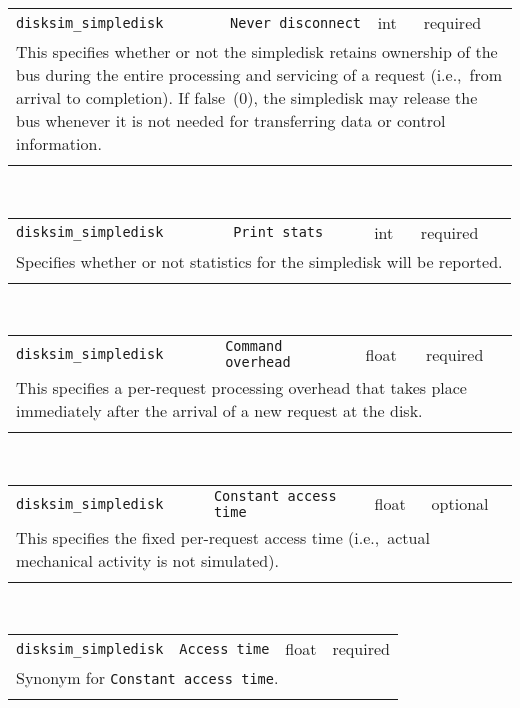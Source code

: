 \noindent 
\begin{tabular}{|p{\lpmodwidth}|p{\lpnamewidth}|p{0.5in}|p{0.5in}|}
\cline{1-4}
\texttt{disksim\_simpledisk} & \texttt{Never disconnect} & int & required \\ 
\cline{1-4}
\multicolumn{4}{|p{6in}|}{
This specifies whether or not the simpledisk retains ownership of the bus
during the entire processing and servicing of a request (i.e.,~from
arrival to completion). If false~(0), the simpledisk may release the
bus whenever it is not needed for transferring data or control
information.
}\\ 
\cline{1-4}
\multicolumn{4}{p{5in}}{}\\
\end{tabular}\\ 
\noindent 
\begin{tabular}{|p{\lpmodwidth}|p{\lpnamewidth}|p{0.5in}|p{0.5in}|}
\cline{1-4}
\texttt{disksim\_simpledisk} & \texttt{Print stats} & int & required \\ 
\cline{1-4}
\multicolumn{4}{|p{6in}|}{
Specifies whether or not statistics for the simpledisk will be reported.
}\\ 
\cline{1-4}
\multicolumn{4}{p{5in}}{}\\
\end{tabular}\\ 
\noindent 
\begin{tabular}{|p{\lpmodwidth}|p{\lpnamewidth}|p{0.5in}|p{0.5in}|}
\cline{1-4}
\texttt{disksim\_simpledisk} & \texttt{Command overhead} & float & required \\ 
\cline{1-4}
\multicolumn{4}{|p{6in}|}{
This specifies a per-request processing overhead that takes place
immediately after the arrival of a new request at the disk.
}\\ 
\cline{1-4}
\multicolumn{4}{p{5in}}{}\\
\end{tabular}\\ 
\noindent 
\begin{tabular}{|p{\lpmodwidth}|p{\lpnamewidth}|p{0.5in}|p{0.5in}|}
\cline{1-4}
\texttt{disksim\_simpledisk} & \texttt{Constant access time} & float & optional \\ 
\cline{1-4}
\multicolumn{4}{|p{6in}|}{
This specifies the fixed per-request access time (i.e.,~actual mechanical
activity is not simulated).
}\\ 
\cline{1-4}
\multicolumn{4}{p{5in}}{}\\
\end{tabular}\\ 
\noindent 
\begin{tabular}{|p{\lpmodwidth}|p{\lpnamewidth}|p{0.5in}|p{0.5in}|}
\cline{1-4}
\texttt{disksim\_simpledisk} & \texttt{Access time} & float & required \\ 
\cline{1-4}
\multicolumn{4}{|p{6in}|}{
Synonym for \texttt{Constant access time}.
}\\ 
\cline{1-4}
\multicolumn{4}{p{5in}}{}\\
\end{tabular}\\ 
